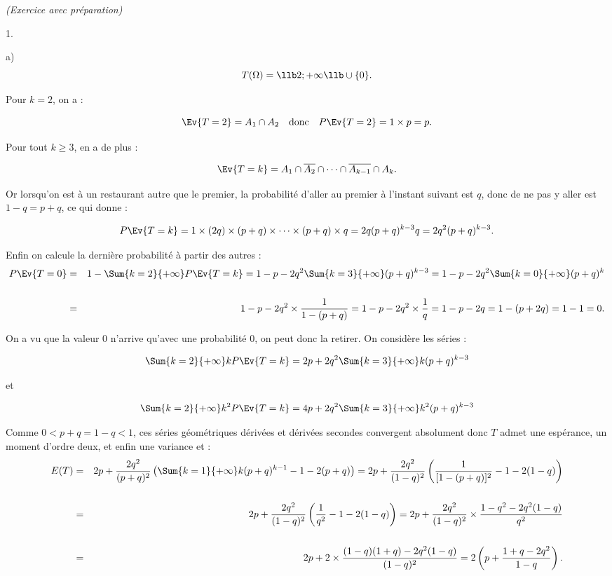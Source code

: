 \documentclass[11pt]{article}%
\begin{document}
\begin{exercice}{\it (Exercice avec préparation)}
\begin{noliste}{1.}
\begin{noliste}{a)}
\[
 T ( \Omega ) = \llb 2 ; + \infty \llb \cup \{ 0 \}. 
\]

 Pour $k = 2$, on a :
 
\[
 \Ev{T = 2 } = A_{1} \cap A_{2} \ \ \text{ donc } \ \ P \Ev{ T = 2 } =
1 \times p = p. 
\]

 Pour tout $k \geq 3$, en a de plus : 
 
\[
 \Ev{T = k } = A_{1} \cap \overline{A_{2} } \cap \dots \cap \overline{
A_{k-1} } \cap A_{k}. 
\]

 Or lorsqu'on est à un restaurant autre que le premier, la probabilité
d'aller au premier à l'instant suivant est $q$, donc de ne pas y aller
est $1-q = p + q$, ce qui donne : 
 
\[
 P \Ev{ T = k } = 1 \times (2q ) \times (p + q ) \times \dots \times (p
+ q) \times q = 2q (p + q)^{k-3} q = 2 q^{2} (p + q)^{k-3}. 
\]

 Enfin on calcule la dernière probabilité à partir des autres : 
 \begin{eqnarray*}
 P \Ev{ T = 0 } & = & 1 - \Sum{k = 2}{+ \infty} P \Ev{ T = k } = 1 - p
- 2 q^{2} \Sum{k = 3}{+ \infty} (p + q)^{k-3} = 1 - p - 2q^{2} \Sum{k =
0}{+ \infty } (p + q)^{k} \\
\\
 & = & 1 - p - 2 q^{2} \times \frac{ 1 }{ 1 - (p + q) } = 1 - p - 2
q^{2} \times \frac{ 1 }{ q } = 1 - p - 2q = 1 - ( p + 2q ) = 1 - 1 = 0.
 \end{eqnarray*}

 \item On a vu que la valeur 0 n'arrive qu'avec une probabilité 0, on
peut donc la retirer. On considère les séries : 
 
\[
 \Sum{k = 2}{+ \infty} k P \Ev{ T = k } = 2 p + 2 q^{2} \Sum{k = 3}{+
\infty} k (p + q)^{k-3} 
\]

 et
 
\[
 \Sum{k = 2}{+ \infty} k^{2} P \Ev{ T = k } = 4 p + 2 q^{2} \Sum{k =
3}{+ \infty} k^{2} (p + q)^{k-3} 
\]

 Comme $0 < p + q = 1 - q < 1$, ces séries géométriques dérivées et
dérivées secondes convergent absolument donc $T$ admet une espérance,
un moment d'ordre deux, et enfin une variance et : 
 \begin{eqnarray*}
 E ( T ) & = & 2 p + \frac{ 2 q^{2} }{ (p + q)^{2} } \left( \Sum{k =
1}{+ \infty} k (p + q)^{k-1} - 1 - 2 (p + q) \right) = 2 p + \frac{ 2
q^{2} }{ (1-q)^{2} } \left( \frac{ 1 }{ [ 1 - (p + q) ]^{2} } - 1 - 2
(1-q) \right) \\
\\
 & = & 2 p + \frac{ 2 q^{2} }{ (1-q)^{2} } \left( \frac{ 1 }{ q^{2} } -
1 - 2 (1-q) \right) = 2 p + \frac{ 2 q^{2} }{ (1-q)^{2} } \times \frac{
1 - q^{2} - 2 q^{2} (1-q) }{ q^{2} } \\
\\
 & = & 2 p + 2 \times \frac{ (1-q) (1 + q) - 2 q^{2} (1-q) }{ (1-q)^{2}
} = 2 \left( p + \frac{ 1 + q - 2 q^{2} }{ 1- q } \right).
 \end{eqnarray*}


\end{noliste}
\end{noliste}
\end{exercice}
\end{document}
